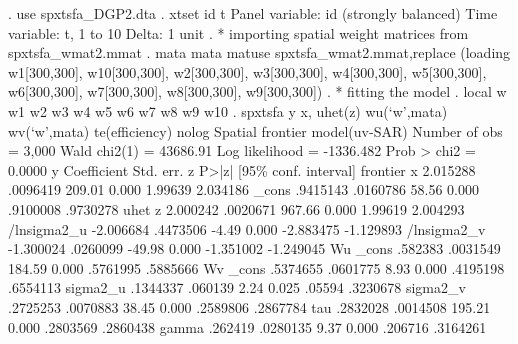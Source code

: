 . use spxtsfa_DGP2.dta
{\smallskip}
. xtset id t 
{\smallskip}
Panel variable: id (strongly balanced)
 Time variable: t, 1 to 10
         Delta: 1 unit
{\smallskip}
. * importing spatial weight matrices from spxtsfa_wmat2.mmat
. mata mata matuse spxtsfa_wmat2.mmat,replace
(loading w1[300,300], w10[300,300], w2[300,300], w3[300,300], w4[300,300], w5[300,300], w6[300,300], w7[300,300],
 w8[300,300], w9[300,300])
{\smallskip}
. * fitting the model
. local w w1 w2 w3 w4 w5 w6 w7 w8 w9 w10
{\smallskip}
. spxtsfa y x, uhet(z) wu(`w',mata) wv(`w',mata) te(efficiency) nolog
{\smallskip}
Spatial frontier model(uv-SAR)                        Number of obs =    3,000
                                                      Wald chi2(1)  = 43686.91
Log likelihood = -1336.482                            Prob > chi2   =   0.0000
{\smallskip}
           y {\VBAR} Coefficient  Std. err.      z    P>|z|     [95\% conf. interval]
frontier     {\VBAR}
           x {\VBAR}   2.015288   .0096419   209.01   0.000      1.99639    2.034186
       _cons {\VBAR}   .9415143   .0160786    58.56   0.000     .9100008    .9730278
uhet         {\VBAR}
           z {\VBAR}   2.000242   .0020671   967.66   0.000      1.99619    2.004293
 /lnsigma2_u {\VBAR}  -2.006684   .4473506    -4.49   0.000    -2.883475   -1.129893
 /lnsigma2_v {\VBAR}  -1.300024   .0260099   -49.98   0.000    -1.351002   -1.249045
Wu           {\VBAR}
       _cons {\VBAR}    .582383   .0031549   184.59   0.000     .5761995    .5885666
Wv           {\VBAR}
       _cons {\VBAR}   .5374655   .0601775     8.93   0.000     .4195198    .6554113
    sigma2_u {\VBAR}   .1344337    .060139     2.24   0.025       .05594    .3230678
    sigma2_v {\VBAR}   .2725253   .0070883    38.45   0.000     .2589806    .2867784
         tau {\VBAR}   .2832028   .0014508   195.21   0.000     .2803569    .2860438
       gamma {\VBAR}    .262419   .0280135     9.37   0.000      .206716    .3164261
